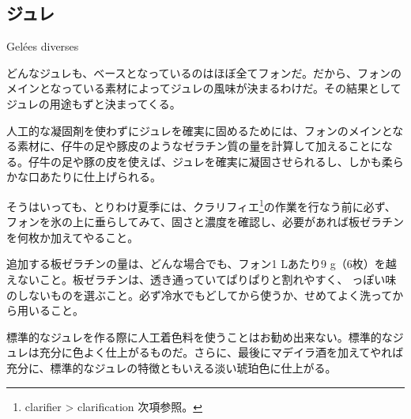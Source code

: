 \newpage

\begin{main}

\hypertarget{gelees-diverses}{%
\section{ジュレ}\label{gelees-diverses}}

\begin{frsecenv}

Gelées diverses

\end{frsecenv}

 

どんなジュレも、ベースとなっているのはほぼ全てフォンだ。だから、フォンのメインとなっている素材によってジュレの風味が決まるわけだ。その結果としてジュレの用途もずと決まってくる。

人工的な凝固剤を使わずにジュレを確実に固めるためには、フォンのメインとなる素材に、仔牛の足や豚皮のようなゼラチン質の量を計算して加えることになる。仔牛の足や豚の皮を使えば、ジュレを確実に凝固させられるし、しかも柔らかな口あたりに仕上げられる。

そうはいっても、とりわけ夏季には、クラリフィエ\footnote{clarifier
  \textgreater{} clarification 次項参照。}の作業を行なう前に必ず、フォンを氷の上に垂らしてみて、固さと濃度を確認し、必要があれば板ゼラチンを何枚か加えてやること。

追加する板ゼラチンの量は、どんな場合でも、フォン1 Lあたり9
g（6枚）を越えないこと。板ゼラチンは、透き通っていてぱりぱりと割れやすく、
っぽい味のしないものを選ぶこと。必ず冷水でもどしてから使うか、せめてよく洗ってから用いること。

標準的なジュレを作る際に人工着色料を使うことはお勧め出来ない。標準的なジュレは充分に色よく仕上がるものだ。さらに、最後にマデイラ酒を加えてやれば充分に、標準的なジュレの特徴ともいえる淡い琥珀色に仕上がる。

\end{main}

